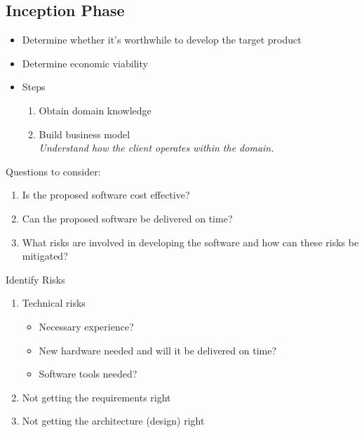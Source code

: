 \documentclass{report}
\begin{document}
			\subsection{Inception Phase}
				\begin{itemize}
					\item Determine whether it's worthwhile to develop the target product
					\item Determine economic viability
					\item Steps
						\begin{enumerate}
							\item Obtain domain knowledge
							\item Build business model\\
								\textit{Understand how the client operates within the domain.}
						\end{enumerate}
				\end{itemize}
				Questions to consider:
				\begin{enumerate}
					\item Is the proposed software cost effective?
					\item Can the proposed software be delivered on time?
					\item What risks are involved in developing the software and how can these risks be mitigated?
				\end{enumerate}
				Identify Risks
				\begin{enumerate}
					\item Technical risks
					\begin{itemize}
						\item Necessary experience?
						\item New hardware needed and will it be delivered on time?
						\item Software tools needed?
					\end{itemize}
					\item Not getting the requirements right
					\item Not getting the architecture (design) right
				\end{enumerate}
\end{document}
